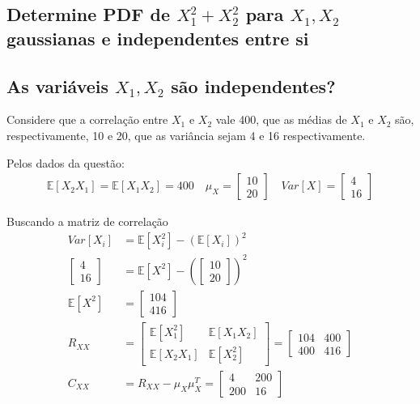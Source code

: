 \documentclass{article}
\begin{document}
\subsection{Determine PDF de $X_1^2 + X_2^2$ para $X_1, X_2$ gaussianas e independentes entre si}

\subsection{As variáveis $X_1, X_2$ são independentes?}
Considere que a correlação entre $X_1$ e $X_2$ vale 400, que as médias de $X_1$ e $X_2$ são,
respectivamente, 10 e 20, que as variância sejam 4 e 16 respectivamente.

Pelos dados da questão:
\begin{align*}
    \mathbb{E}[X_2X_1] = \mathbb{E}[X_1X_2] = 400 \quad \mu_X = \begin{bmatrix} 10\\20 \end{bmatrix} \quad Var[X] = \begin{bmatrix} 4\\16 \end{bmatrix}
\end{align*}

Buscando a matriz de correlação
\begin{align*}
    Var[X_i] &= \mathbb{E}[X_i^2] - (\mathbb{E}[X_i])^2 \\
    \begin{bmatrix} 4\\16 \end{bmatrix} &= \mathbb{E}[X^2] - \left(\begin{bmatrix} 10\\20 \end{bmatrix}\right)^2 \\
    \mathbb{E}[X^2] &= \begin{bmatrix} 104\\416 \end{bmatrix} \\
    R_{XX} &=  \begin{bmatrix} \mathbb{E}[X_1^2]&\mathbb{E}[X_1X_2] \\ \mathbb{E}[X_2X_1]&\mathbb{E}[X_2^2] \end{bmatrix} = \begin{bmatrix} 104&400\\400&416 \end{bmatrix} \\
    C_{XX} &= R_{XX} -\mu_X\mu_X^T = \begin{bmatrix} 4&200\\200&16 \end{bmatrix}
\end{align*}
\end{document}
